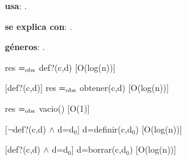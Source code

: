 \begin{Interfaz}
  
  \textbf{usa}: \tadNombre{}.
  
  \textbf{se explica con}: .

  \textbf{g\'eneros}: .


  {res $=_{\mathrm{obs}}$ def?(c,d)}%
  [O(log(n))]

  [def?(c,d)]
  {res $=_{\mathrm{obs}}$ obtener(c,d)}%
  [O(log(n))]
  
  {res $=_{\mathrm{obs}}$ vacio()}%
  [O(1)]
  
  [$\neg$def?(c,d) $\wedge$ d=d$_0$]
  {d=definir(c,d$_0$)}%
  [O(log(n))]
  
  [def?(c,d) $\wedge$ d=d$_0$]
  {d=borrar(c,d$_0$)}%
  [O(log(n))]

\end{Interfaz}

\newpage 

